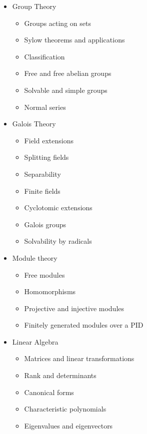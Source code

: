 \begin{itemize}
\tightlist
\item
  Group Theory

  \begin{itemize}
  \tightlist
  \item
    Groups acting on sets
  \item
    Sylow theorems and applications
  \item
    Classification
  \item
    Free and free abelian groups
  \item
    Solvable and simple groups
  \item
    Normal series
  \end{itemize}
\item
  Galois Theory

  \begin{itemize}
  \tightlist
  \item
    Field extensions
  \item
    Splitting fields
  \item
    Separability
  \item
    Finite fields
  \item
    Cyclotomic extensions
  \item
    Galois groups
  \item
    Solvability by radicals
  \end{itemize}
\item
  Module theory

  \begin{itemize}
  \tightlist
  \item
    Free modules
  \item
    Homomorphisms
  \item
    Projective and injective modules
  \item
    Finitely generated modules over a PID
  \end{itemize}
\item
  Linear Algebra

  \begin{itemize}
  \tightlist
  \item
    Matrices and linear transformations
  \item
    Rank and determinants
  \item
    Canonical forms
  \item
    Characteristic polynomials
  \item
    Eigenvalues and eigenvectors
  \end{itemize}
\end{itemize}

